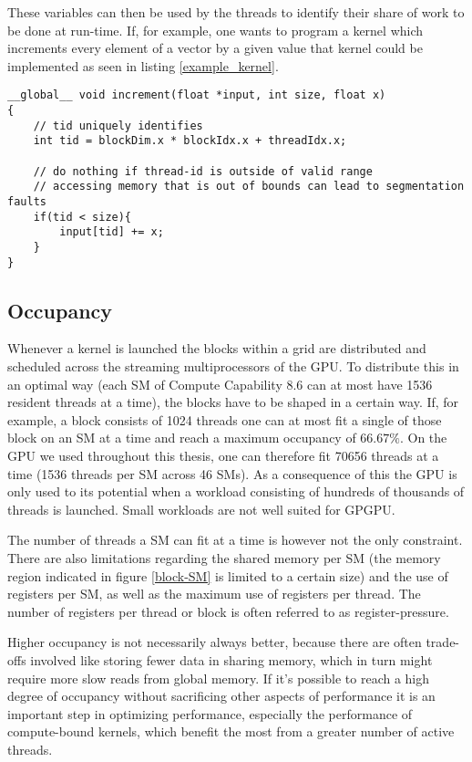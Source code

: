 \documentclass[english,11pt,a4paper,table]{article} %
\begin{document}
These variables can then be used by the threads to identify their share of work to be done at run-time.
If, for example, one wants to program a kernel which increments every element of a vector by a given value that kernel could be implemented as seen in listing \ref{example_kernel}.

\begin{verbatim}
__global__ void increment(float *input, int size, float x)
{
	// tid uniquely identifies 
	int tid = blockDim.x * blockIdx.x + threadIdx.x;
	
	// do nothing if thread-id is outside of valid range
	// accessing memory that is out of bounds can lead to segmentation faults
	if(tid < size){
		input[tid] += x;
	}
}
\end{verbatim}

\subsection{Occupancy}

Whenever a kernel is launched the blocks within a grid are distributed and scheduled across the streaming multiprocessors of the GPU.
To distribute this in an optimal way (each SM of Compute Capability 8.6 can at most have 1536 resident threads at a time), the blocks have to be shaped in a certain way.
If, for example, a block consists of 1024 threads one can at most fit a single of those block on an SM at a time and reach a maximum occupancy of $66.67\%$.
On the GPU we used throughout this thesis, one can therefore fit 70656 threads at a time (1536 threads per SM across 46 SMs).
As a consequence of this the GPU is only used to its potential when a workload consisting of hundreds of thousands of threads is launched.
Small workloads are not well suited for GPGPU.

The number of threads a SM can fit at a time is however not the only constraint.
There are also limitations regarding the shared memory per SM (the memory region indicated in figure \ref{block-SM} is limited to a certain size) and the use of registers per SM, as well as the maximum use of registers per thread.
The number of registers per thread or block is often referred to as register-pressure.

Higher occupancy is not necessarily always better, because there are often trade-offs involved like storing fewer data in sharing memory, which in turn might require more slow reads from global memory.
If it's possible to reach a high degree of occupancy without sacrificing other aspects of performance it is an important step in optimizing performance, especially the performance of compute-bound kernels, which benefit the most from a greater number of active threads.
\end{document}
